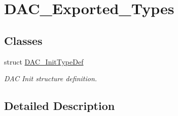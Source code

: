 \hypertarget{group___d_a_c___exported___types}{}\section{D\+A\+C\+\_\+\+Exported\+\_\+\+Types}
\label{group___d_a_c___exported___types}
\subsection*{Classes}
\begin{DoxyCompactItemize}
\item 
struct \hyperlink{struct_d_a_c___init_type_def}{D\+A\+C\+\_\+\+Init\+Type\+Def}
\begin{DoxyCompactList}\small\item\em D\+AC Init structure definition. \end{DoxyCompactList}\end{DoxyCompactItemize}


\subsection{Detailed Description}
